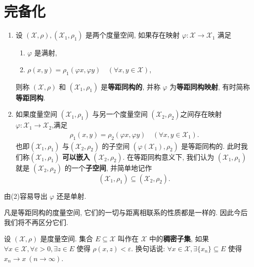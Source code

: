 \documentclass[../../main.tex]{subfiles}%
\begin{document}
\section{完备化}

\begin{definition}
\begin{enumerate}
\item 设 $(\mathscr{X},\rho),(\mathscr{X}_1,\rho_1)$ 是两个度量空间, 如果存在映射 $\varphi:\mathscr{X}\to\mathscr{X}_1$ 满足
\begin{enumerate}[(1)]
\item $\varphi$ 是满射,
\item $\rho(x,y)=\rho_1(\varphi x,\varphi y)\quad (\forall x,y\in\mathscr{X})$,
\end{enumerate}
则称 $(\mathscr{X},\rho)$ 和 $(\mathscr{X}_1,\rho_1)$ 是\textbf{等距同构的}, 并称 $\varphi$ 为\textbf{等距同构映射}, 有时简称\textbf{等距同构}.

\item 如果度量空间 $(\mathscr{X}_1,\rho_1)$ 与另一个度量空间 $(\mathscr{X}_2,\rho_2)$之间存在映射$\varphi:\mathscr{X}_1\to \mathscr{X}_2$,满足
\begin{align*}
\rho_1(x,y)=\rho_2(\varphi x,\varphi y)\quad (\forall x,y\in\mathscr{X}_1).
\end{align*}
也即$(\mathscr{X}_1,\rho_1)$ 与$(\mathscr{X}_2,\rho_2)$ 的子空间 $(\varphi(\mathscr{X}_1),\rho_2)$ 是等距同构的.
此时我们称$(\mathscr{X}_1,\rho_1)$ \textbf{可以嵌入} $(\mathscr{X}_2,\rho_2)$. 在等距同构意义下, 我们认为 $(\mathscr{X}_1,\rho_1)$ 就是 $(\mathscr{X}_2,\rho_2)$ 的一个\textbf{子空间}, 并简单地记作
$$
(\mathscr{X}_1,\rho_1)\subseteq(\mathscr{X}_2,\rho_2).
$$
\end{enumerate}
\end{definition}
\begin{remark}
由(2)容易导出 $\varphi$ 还是单射.
\end{remark}
\begin{remark}
凡是等距同构的度量空间, 它们的一切与距离相联系的性质都是一样的. 因此今后我们将不再区分它们. 
\end{remark}

\begin{definition}[稠密子集]
设 $(\mathscr{X},\rho)$ 是度量空间. 集合 $E\subseteq\mathscr{X}$ 叫作在 $\mathscr{X}$ 中的\textbf{稠密子集}, 如果 $\forall x\in\mathscr{X},\forall\varepsilon>0,\exists z\in E$ 使得 $\rho(x,z)<\varepsilon$. 换句话说: $\forall x\in\mathscr{X},\exists\{x_n\}\subseteq E$ 使得 $x_n\to x\ (n\to\infty)$.
\end{definition}
\end{document}
